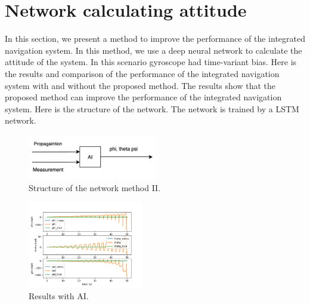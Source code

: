 \documentclass[conference]{IEEEtran}
\begin{document}
    \section{Network calculating attitude}
    In this section, we present a method to improve the performance of the integrated navigation system. In this method, we use a deep neural network to calculate the attitude of the system. In this scenario gyroscope had time-variant bias. Here is the results and comparison of the performance of the integrated navigation system with and without the proposed method. The results show that the proposed method can improve the performance of the integrated navigation system. Here is the structure of the network. The network is trained by a LSTM network.
    \begin{figure}[H]
        \centerline{\includegraphics[width=0.5\textwidth]{../Figures/part_2_network.png}}
        \caption{Structure of the network method II.}
    \end{figure}
    \begin{figure}[H]
        \centerline{\includegraphics[width=0.45\textwidth]{../Figures/part_2.png}}
        \caption{Results with AI.}
    \end{figure}
\end{document}
